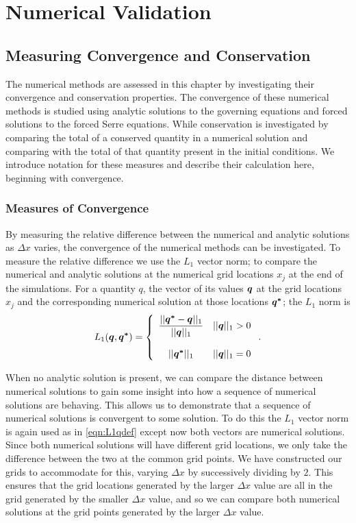 
\chapter{Numerical Validation}
\label{chp:NumMethodComp}

\section{Measuring Convergence and Conservation}
The numerical methods are assessed in this chapter by investigating their convergence and conservation properties. The convergence of these numerical methods is studied using analytic solutions to the governing equations and forced solutions to the forced Serre equations. While conservation is investigated by comparing the total of a conserved quantity in a numerical solution and comparing with the total of that quantity present in the initial conditions. We introduce notation for these measures and describe their calculation here, beginning with convergence.

\subsection{Measures of Convergence}
By measuring the relative difference between the numerical and analytic solutions as $\Delta x$ varies, the convergence of the numerical methods can be investigated. To measure the relative difference we use the $L_1$ vector norm; to compare the numerical and analytic solutions at the numerical grid locations $x_j$ at the end of the simulations. For a quantity $q$, the vector of its values $\boldsymbol{q}$ at the grid locations $x_j$ and the corresponding numerical solution at those locations $\boldsymbol{q^*}$; the $L_1$ norm is
\begin{equation}
L_1(\boldsymbol{q},\boldsymbol{q^*}) =  \left\lbrace \begin{array}{c r} 
\dfrac{||\boldsymbol{q^*} - \boldsymbol{q}||_{1}}{||\boldsymbol{q}||_{1}} & ||\boldsymbol{q}||_{1} > 0 \\ \\
{||\boldsymbol{q^*}||_{1}} & ||\boldsymbol{q}||_{1} = 0  \end{array}\right. . 
\label{eqn:L1qdef} 
\end{equation}


When no analytic solution is present, we can compare the distance between numerical solutions to gain some insight into how a sequence of numerical solutions are behaving. This allows us to demonstrate that a sequence of numerical solutions is convergent to some solution. To do this the $L_1$ vector norm is again used as in \eqref{eqn:L1qdef} except now both vectors are numerical solutions. Since both numerical solutions will have different grid locations, we only take the difference between the two at the common grid points. We have constructed our grids to accommodate for this, varying $\Delta x$ by successively dividing by $2$. This ensures that the grid locations generated by the larger $\Delta x$ value are all in the grid generated by the smaller $\Delta x$ value, and so we can compare both numerical solutions at the grid points generated by the larger $\Delta x$ value.  



